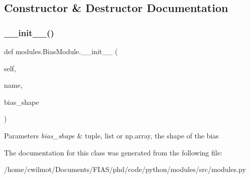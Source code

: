 \subsection{Constructor \& Destructor Documentation}
\mbox{\label{classmodules_1_1_bias_module_a680a602fe8d3f45ef483964d1b30e42b}} 
\subsubsection{\texorpdfstring{\+\_\+\+\_\+init\+\_\+\+\_\+()}{\_\_init\_\_()}}
{\footnotesize\ttfamily def modules.\+Bias\+Module.\+\_\+\+\_\+init\+\_\+\+\_\+ (\begin{DoxyParamCaption}\item[{}]{self,  }\item[{}]{name,  }\item[{}]{bias\+\_\+shape }\end{DoxyParamCaption})}


\begin{DoxyParams}{Parameters}
{\em bias\+\_\+shape} & tuple, list or np.\+array, the shape of the bias \\
\hline
\end{DoxyParams}


The documentation for this class was generated from the following file\+:\begin{DoxyCompactItemize}
\item 
/home/cwilmot/\+Documents/\+F\+I\+A\+S/phd/code/python/modules/src/modules.\+py\end{DoxyCompactItemize}
